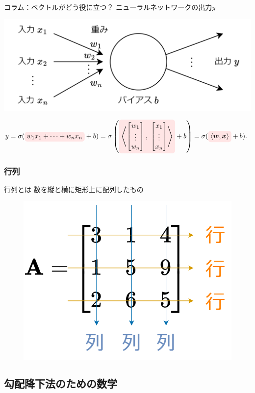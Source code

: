 \documentclass[dvipdfmx,aspectratio=169]{beamer}
\newcommand{\highlight}[2][yellow]{\tikz[baseline=(x.base)]{\node[rectangle,rounded corners,fill=#1!10](x){#2};}}
\begin{document}
	\begin{frame}{コラム：ベクトルがどう役に立つ？}
		ニューラルネットワークの出力$ y $
		\begin{center}
			\includegraphics[width=0.5\linewidth]{img/summary-of-unit}
		\end{center}
		$ y = \sigma(\highlight[red]{$ w_1x_1 + \cdots + w_nx_n $} +b) = \sigma\left(\highlight[red]{$ \left\langle\begin{bmatrix}
			w_1\\
			\vdots\\
			w_n
		\end{bmatrix},\ \begin{bmatrix}
			x_1\\
			\vdots\\
			x_n
		\end{bmatrix}\right\rangle $} + b\right) = \sigma(\highlight[red]{$ \langle\boldsymbol{w}, \boldsymbol{x}\rangle $} + b). $
	\end{frame}	
	
	\subsubsection{行列}
	\begin{frame}{行列とは}
		数を縦と横に矩形上に配列したもの
		\begin{figure}
			\centering
			\includegraphics[width=0.4\linewidth]{img/example-of-matrix}
		\end{figure}
	\end{frame}

	\subsection{勾配降下法のための数学}
\end{document}

